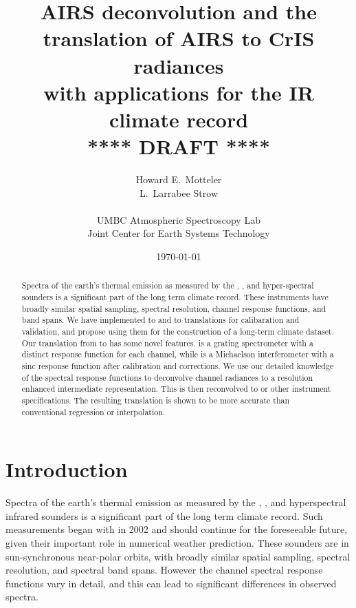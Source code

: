 \documentclass[10pt,twocolumn]{article}
\title{AIRS deconvolution and the \\
       translation of AIRS to CrIS radiances \\ 
       with applications for the IR climate record \\
  \vspace{3mm}
  {****} DRAFT {****}\\
}
\author{Howard E.~Motteler \\
  L.~Larrabee Strow \\
  \\
  UMBC Atmospheric Spectroscopy Lab \\
  Joint Center for Earth Systems Technology \\
}
\date{\today}
\begin{document}
\maketitle

\begin{abstract}

Spectra of the earth's thermal emission as measured by the {\airs},
{\cris}, and {\iasi} hyper-spectral sounders is a significant part
of the long term climate record.  These instruments have broadly
similar spatial sampling, spectral resolution, channel response
functions, and band spans.  We have implemented {\airs} to {\cris}
and {\iasi} to {\cris} translations for calibaration and validation,
and propose using them for the construction of a long-term climate
dataset.  Our translation from {\airs} to {\cris} has some novel
features.  {\airs} is a grating spectrometer with a distinct
response function for each channel, while {\cris} is a Michaelson
interferometer with a sinc response function after calibration and
corrections.  We use our detailed knowledge of the {\airs} spectral
response functions to deconvolve {\airs} channel radiances to a
resolution enhanced intermediate representation.  This is then
reconvolved to {\cris} or other instrument specifications.  The
resulting translation is shown to be more accurate than conventional
regression or interpolation.

\end{abstract}

\section{Introduction}

Spectra of the earth's thermal emission as measured by the {\airs}
\cite{airs1}, {\cris} \cite{cris1,cris2}, and {\iasi} \cite{iasi1}
hyperspectral infrared sounders is a significant part of the long
term climate record.  Such measurements began with {\airs} in 2002
and should continue for the foreseeable future, given their
important role in numerical weather prediction.  These sounders are
in sun-synchronous near-polar orbits, with broadly similar spatial
sampling, spectral resolution, and spectral band spans.  However the
channel spectral response functions vary in detail, and this can
lead to significant differences in observed spectra.
\end{document}
